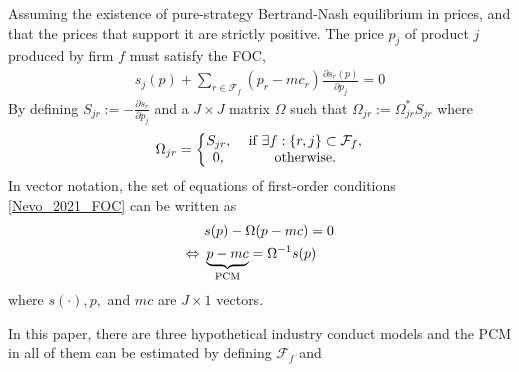 \documentclass[11pt]{elegantbook}
\begin{document}
Assuming the existence of pure-strategy Bertrand-Nash equilibrium in prices, and that the prices that support it are strictly positive. The price $p_j$ of product $j$ produced by firm $f$ must satisfy the FOC,
\begin{equation}
    \begin{aligned}
        s_j(p)+\sum_{r\in\mathcal{F}_f}(p_r-mc_r)\frac{\partial s_r(p)}{\partial p_j}=0
    \end{aligned}
    \label{Nevo_2021_FOC}
\end{equation}
By defining $S_{jr}:=-\frac{\partial s_r}{\partial p_j}$ and a $J\times J$ matrix $\Omega$ such that $\Omega_{jr}:=\Omega_{jr}^*S_{jr}$ where $$\Omega_{jr}=\left\{\begin{matrix}
    S_{jr},& \textnormal{ if }\exists f:\{r,j\}\subset \mathcal{F}_f,\\
    0,& \textnormal{ otherwise}.
\end{matrix}\right.$$
In vector notation, the set of equations of first-order conditions \eqref{Nevo_2021_FOC} can be written as
\begin{equation}
    \begin{aligned}
        &s(p)-\Omega(p-mc)=0\\
        \Leftrightarrow\ &\underbrace{p-mc}_\textnormal{PCM}=\Omega^{-1}s(p)
    \end{aligned}
    \nonumber
\end{equation}
where $s(\cdot),p,$ and $mc$ are $J\times 1$ vectors.

In this paper, there are three  hypothetical industry conduct models and the PCM in all of them can be estimated by defining $\mathcal{F}_f$ and 




















\end{document}
